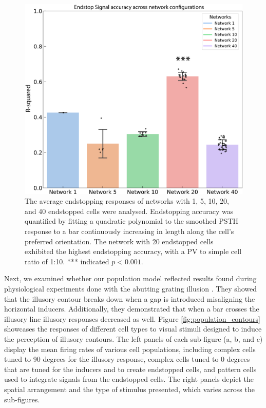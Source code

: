 \documentclass[12pt]{article}
\begin{document}
\begin{figure}[H]
  \centering
  \includegraphics[width=1.0 \textwidth]{adjusted_figures/figure_networks_bar.png}
  \caption{The average endstopping responses of networks with 1, 5, 10, 20, and 40 endstopped cells were analysed. Endstopping accuracy was quantified by fitting a quadratic polynomial to the smoothed PSTH response to a bar continuously increasing in length along the cell's preferred orientation. The network with 20 endstopped cells exhibited the highest endstopping accuracy, with a PV to simple cell ratio of 1:10. *** indicated $p < 0.001$.}
  \label{fig:endstop_network}
\end{figure}
Next, we examined whether our population model reflected results found during physiological experiments done with the abutting grating illusion \autocite{vonderheydtMechanismsContourPerception1989}. They showed that the illusory contour breaks down when a gap is introduced misaligning the horizontal inducers. Additionally, they demonstrated that when a bar crosses the illusory line illusory responses decreased as well. Figure \ref{fig:population_contours} showcases the responses of different cell types to visual stimuli designed to induce the perception of illusory contours. The left panels of each sub-figure (a, b, and c) display the mean firing rates of various cell populations, including complex cells tuned to 90 degrees for the illusory response, complex cells tuned to 0 degrees that are tuned for the inducers and to create endstopped cells, and pattern cells used to integrate signals from the endstopped cells. The right panels depict the spatial arrangement and the type of stimulus presented, which varies across the sub-figures.
\end{document}
